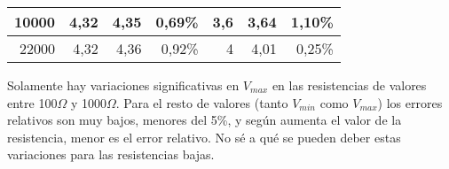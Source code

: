 \documentclass{article}
\begin{document}
\begin{table}[ht!]
\begin{tabular}{|r|r|r|r|r|r|r|}
10000                                  & 4,32                               & 4,35                                    & 0,69\%                                                & 3,6                                                     & 3,64                                    & 1,10\%                           \\ \hline
22000                                  & 4,32                               & 4,36                                    & 0,92\%                                                & 4                                                       & 4,01                                    & 0,25\%                           \\ \hline
\end{tabular}
\end{table}

Solamente hay variaciones significativas en $V_{max}$ en las resistencias de valores entre 100$\Omega$ y 1000$\Omega$. Para el resto de valores (tanto $V_{min}$ como $V_{max}$) los errores relativos son muy bajos, menores del 5\%, y según aumenta el valor de la resistencia, menor es el error relativo. No sé a qué se pueden deber estas variaciones para las resistencias bajas.
\end{document}
